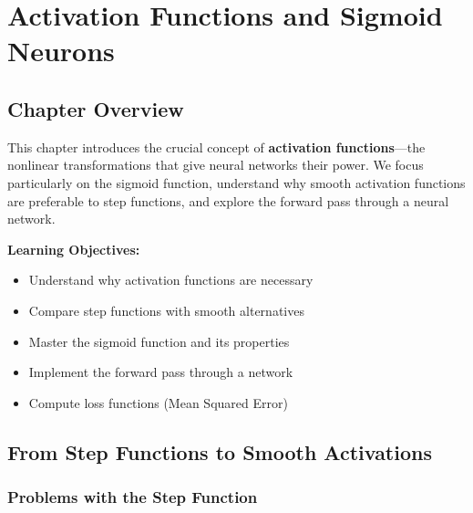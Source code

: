 
\chapter{Activation Functions and Sigmoid Neurons}
\label{ch:activation_functions}


\section{Chapter Overview}

This chapter introduces the crucial concept of \textbf{activation functions}---the nonlinear transformations that give neural networks their power. We focus particularly on the sigmoid function, understand why smooth activation functions are preferable to step functions, and explore the forward pass through a neural network.

\textbf{Learning Objectives:}
\begin{itemize}
    \item Understand why activation functions are necessary
    \item Compare step functions with smooth alternatives
    \item Master the sigmoid function and its properties
    \item Implement the forward pass through a network
    \item Compute loss functions (Mean Squared Error)
\end{itemize}


\section{From Step Functions to Smooth Activations}

\subsection{Problems with the Step Function}

